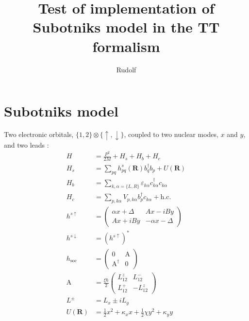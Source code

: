 \documentclass{article}
\renewcommand{\vec}[1]{\mathbf{#1}}
\newcommand{\pdagger}{{\phantom{\dagger}}}
\begin{document}
\title{Test of implementation of Subotniks model in the TT formalism}
\author{Rudolf}
\maketitle
\section{Subotniks model}
Two electronic orbitals, $\{1,2\}\otimes \{\uparrow,\downarrow\}$, coupled to two nuclear modes, $x$ and $y$, and two leads \cite{teh2022spin,teh2021antisymmetric}:
\begin{align}
	H &= \frac{P^2}{2M} + H_s + H_b + H_c\\
	H_s &= \sum_{pq} h_{pq}^s(\vec{R}) b_q^\dagger b_p^\pdagger + U(\vec{R})\\
	H_b &= \sum_{k,\alpha=\{L,R\}} \varepsilon_{k\alpha}^\pdagger c_{k\alpha}^\dagger c_{k\alpha}^\pdagger\\
	H_c&= \sum_{p,k\alpha}V_{p,k\alpha}b_p^\dagger c_{k\alpha}+\mathrm{h.c.}\\
	h^{s\uparrow}&=\begin{pmatrix}
		\alpha x+\Delta & Ax-iBy\\
		Ax+iBy & -\alpha x-\Delta
	\end{pmatrix}\\
	h^{s\downarrow} &= (h^{s\uparrow})^*\\
	h_\mathrm{soc} &= \begin{pmatrix}
		0 & \mathrm{A}\\
		\mathrm{A}^\dagger & 0
	\end{pmatrix} \\
	\mathrm{A} &= \frac{\xi \hbar}{2}\begin{pmatrix}
		L_{12}^z & L^-_{12}\\
		L_{12}^+ & -L^z_{12}
	\end{pmatrix}\\
	L^\pm &= L_x \pm i L_y\\
	U(\vec{R})&= \frac{1}{2}x^2 + \kappa_x x + \frac{1}{2}\chi y^2 + \kappa_y y
\end{align}
\clearpage
\end{document}
